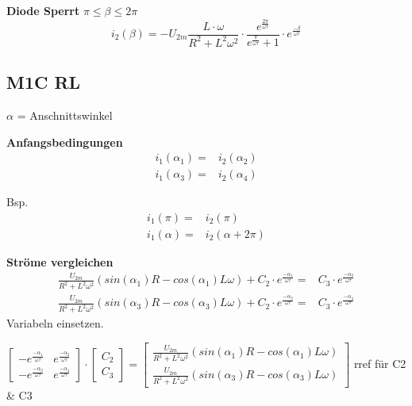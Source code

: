 \textbf{Diode Sperrt} $ \pi \leq \beta \leq 2\pi $\newline
\[ i_2(\beta) = -U_{2m} \frac{L \cdot \omega}{R^2 + L^2\omega^2} \cdot  \frac{e^{\frac{2\pi}{\omega \tau}}}{e^{\frac{\pi}{\omega \tau}} +1} \cdot e^{\frac{-\beta}{\omega \tau}} \]


\subsection*{M1C RL}
$ \alpha $ = Anschnittswinkel \newline
\begin{minipage}{8cm}
    \textbf{Anfangsbedingungen}
    \begin{align*}
        i_1(\alpha_1) = & i_2(\alpha_2)\\
        i_1(\alpha_3)  = & i_2(\alpha_4)
    \end{align*}
\end{minipage}
\begin{minipage}{8cm}
    Bsp.
    \begin{align*}
    i_1(\pi) = & i_2(\pi)\\
    i_1(\alpha)  = & i_2(\alpha + 2\pi)
    \end{align*}
\end{minipage}

\textbf{Ströme vergleichen}
\begin{align*}
 \frac{U_{2m}}{R^2 + L^2\omega^2}\left(sin(\alpha_1) R - cos(\alpha_1) L\omega\right) + C_2 \cdot e^{\frac{-\alpha_1}{\omega \tau}} = & C_3 \cdot e^{\frac{-\alpha_2}{\omega \tau}}\\
 \frac{U_{2m}}{R^2 + L^2\omega^2}\left(sin(\alpha_3) R - cos(\alpha_3) L\omega\right) + C_2 \cdot e^{\frac{-\alpha_3}{\omega \tau}} = & C_3 \cdot e^{\frac{-\alpha_4}{\omega \tau}} 
\end{align*}
Variabeln einsetzen.\newline
\begin{minipage}{\linewidth}
    $
    \begin{bmatrix}
        -e^{\frac{-\alpha_1}{\omega \tau}}       &e^{\frac{-\alpha_2}{\omega \tau}} \\
        -e^{\frac{-\alpha_3}{\omega \tau}}       &e^{\frac{-\alpha_4}{\omega \tau}}
    \end{bmatrix} 
    \cdot
    \begin{bmatrix}
        C_2\\
        C_3
    \end{bmatrix} 
    =
    \begin{bmatrix}
        \frac{U_{2m}}{R^2 + L^2\omega^2}\left(sin(\alpha_1) R - cos(\alpha_1) L\omega\right)\\
        \frac{U_{2m}}{R^2 + L^2\omega^2}\left(sin(\alpha_3) R - cos(\alpha_3) L\omega\right)
    \end{bmatrix} 
    $ \newline
    rref für C2 \& C3 \\
\end{minipage}

